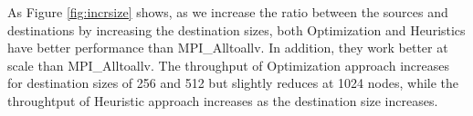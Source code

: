 As Figure \ref{fig:incrsize} shows, as we increase the ratio between the sources and destinations by increasing the destination sizes, both Optimization and Heuristics have better performance than MPI\_Alltoallv. In addition, they work better at scale than MPI\_Alltoallv. The
 throughput of Optimization approach increases for destination sizes of 256 and 512 but slightly reduces at 1024 nodes, while the throughtput of Heuristic approach increases as the destination size increases.
